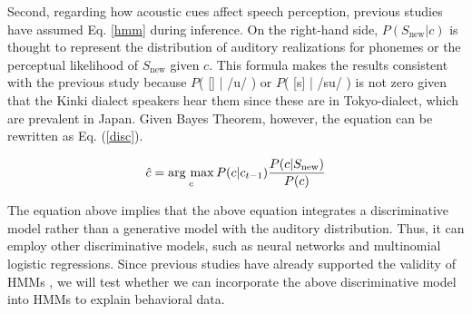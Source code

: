 \documentclass[a4paper,11pt,twocolumn]{article}
\newcommand{\argmax}{\mathop{\rm arg~max}\limits}
\begin{document}
Second, regarding how acoustic cues affect speech perception, previous studies \cite{wilson2013bayesian, kishiyama2021influence} have assumed Eq. \ref{hmm} during inference. On the right-hand side, $P(S_{\text{new}}|c)$ is thought to represent the distribution of auditory realizations for phonemes or the perceptual likelihood of $S_{\text{new}}$ given $c$. This formula makes the results consistent with the previous study because $P$( [\textsubring{\textturnm}] | /u/ ) or $P$( [s] | /su/ ) is not zero given that the Kinki dialect speakers hear them since these are in Tokyo-dialect, which are prevalent in Japan. Given Bayes Theorem, however, the equation can be rewritten as Eq. (\ref{disc}).

\begin{equation} \label{disc}
    \hat{c} = \argmax_{c} P(c | c_{t-1}) \frac{P(c|S_{\text{new}})}{P(c)}
\end{equation}

The equation above implies that the above equation integrates a discriminative model rather than a generative model with the auditory distribution. Thus, it can employ other discriminative models, such as neural networks and multinomial logistic regressions. Since previous studies have already supported the validity of HMMs \cite{kishiyama2021influence}, we will test whether we can incorporate the above discriminative model into HMMs to explain behavioral data.




\end{document}
